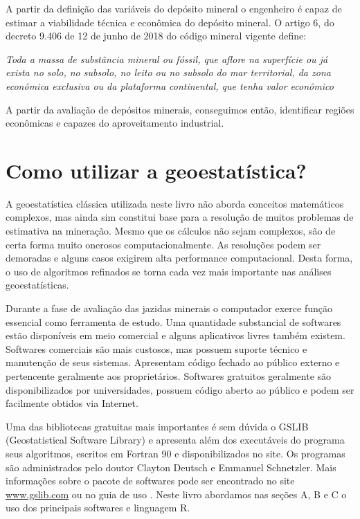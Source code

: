A partir da definição das variáveis do depósito mineral o engenheiro é capaz de estimar a viabilidade técnica e econômica do depósito mineral.  O artigo 6, do decreto 9.406 de 12 de junho de 2018 do código mineral vigente define:

\begin{definition}
	\textit{Toda a massa de substância mineral ou fóssil, que aflore na superfície ou já exista no solo, no subsolo, no leito ou no subsolo do mar territorial, da zona econômica exclusiva ou da plataforma continental, que tenha valor econômico}
\end{definition}


 A partir da avaliação de depósitos minerais, conseguimos então, identificar regiões econômicas e capazes do aproveitamento industrial. 


\section{Como utilizar a geoestatística?}

A geoestatística clássica utilizada neste livro não aborda conceitos matemáticos complexos, mas ainda sim constitui base para a resolução de muitos problemas de estimativa na mineração. Mesmo que os cálculos não sejam complexos, são de certa forma muito onerosos computacionalmente. As resoluções podem ser demoradas e alguns casos exigirem alta performance computacional. Desta forma, o uso de algoritmos refinados se torna cada vez mais importante nas análises geoestatísticas. 

Durante a fase de avaliação das jazidas minerais o computador exerce função essencial como ferramenta de estudo. Uma quantidade substancial de softwares estão disponíveis em meio comercial e alguns aplicativos livres também existem. Softwares comerciais são mais custosos, mas possuem suporte técnico e manutenção de seus sistemas. Apresentam código fechado ao público externo e pertencente geralmente aos proprietários. Softwares gratuitos geralmente são disponibilizados por universidades, possuem código aberto ao público e podem ser facilmente obtidos via Internet. 

Uma das bibliotecas gratuitas mais importantes é sem dúvida o GSLIB (Geostatistical Software Library) e apresenta além dos executáveis do programa seus algoritmos, escritos em Fortran 90 e disponibilizados no site. Os programas são administrados pelo doutor Clayton Deutsch e Emmanuel Schnetzler. Mais informações sobre o pacote de softwares pode ser encontrado no site \url{www.gslib.com} ou no guia de uso \cite{deutschcv1998gslib}. Neste livro abordamos nas seções A, B e C o uso dos principais softwares e linguagem R.  

